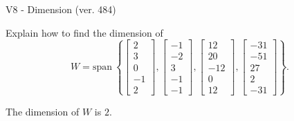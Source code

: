 \begin{exercise}
  \begin{exerciseTitle}V8 - Dimension (ver. 484)\end{exerciseTitle}
  \begin{exerciseStatement}
    Explain how to find the dimension of 
\[W=\mathrm{span}\ \left\{\left[\begin{array}{r}
2 \\
3 \\
0 \\
-1 \\
2
\end{array}\right] , \left[\begin{array}{r}
-1 \\
-2 \\
3 \\
-1 \\
-1
\end{array}\right] , \left[\begin{array}{r}
12 \\
20 \\
-12 \\
0 \\
12
\end{array}\right] , \left[\begin{array}{r}
-31 \\
-51 \\
27 \\
2 \\
-31
\end{array}\right]\right\}.\]



  \end{exerciseStatement}
  \begin{exerciseAnswer}
   The dimension of \(W\) is  \(2\).
  


  \end{exerciseAnswer}
\end{exercise}